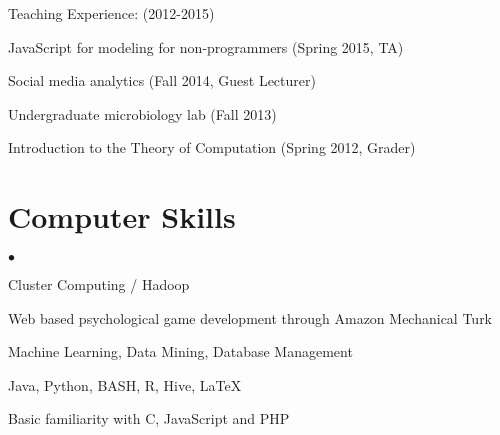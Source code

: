 \documentclass[margin,line]{res}
\newcommand{\linkToUrl}[1]{{\color{blue}\underline{\href{#1}{Link}}}}
\newenvironment{list1}{
  \begin{list}{\ding{113}}{%
      \setlength{\itemsep}{0in}
      \setlength{\parsep}{0in} \setlength{\parskip}{0in}
      \setlength{\topsep}{0in} \setlength{\partopsep}{0in} 
      \setlength{\leftmargin}{0.17in}}}{\end{list}}
\newenvironment{list2}{
  \begin{list}{$\bullet$}{%
      \setlength{\itemsep}{0in}
      \setlength{\parsep}{0in} \setlength{\parskip}{0in}
      \setlength{\topsep}{0in} \setlength{\partopsep}{0in} 
      \setlength{\leftmargin}{10pt}}}{\end{list}}
\begin{document}
\begin{resume}
Teaching Experience: (2012-2015)
\begin{list1}
\item[] JavaScript for modeling for non-programmers (Spring 2015, TA)
\item[] Social media analytics (Fall 2014, Guest Lecturer)
\item[] Undergraduate microbiology lab (Fall 2013)
\item[] Introduction to the Theory of Computation (Spring 2012, Grader)
\end{list1}








\section{\sc Computer Skills} 
\begin{list2}
\item Cluster Computing / Hadoop 
\item Web based psychological game development through Amazon Mechanical Turk
\item Machine Learning, Data Mining, Database Management
\item Java, Python, BASH, R, Hive, \LaTeX
\item Basic familiarity with C,  JavaScript and PHP
\end{list2}
\newpage


\end{resume}
\end{document}
